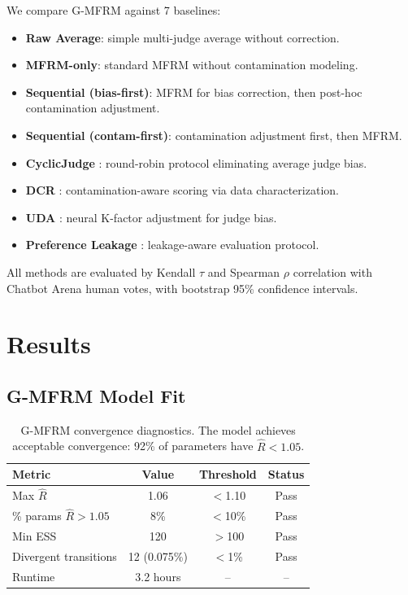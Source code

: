 \documentclass[11pt]{article}
\begin{document}
We compare G-MFRM against 7 baselines:
\begin{itemize}
\item \textbf{Raw Average}: simple multi-judge average without correction.
\item \textbf{MFRM-only}: standard MFRM without contamination modeling.
\item \textbf{Sequential (bias-first)}: MFRM for bias correction, then post-hoc contamination adjustment.
\item \textbf{Sequential (contam-first)}: contamination adjustment first, then MFRM.
\item \textbf{CyclicJudge} \citep{cyclicjudge2025}: round-robin protocol eliminating average judge bias.
\item \textbf{DCR} \citep{dcr2025}: contamination-aware scoring via data characterization.
\item \textbf{UDA} \citep{uda2025}: neural K-factor adjustment for judge bias.
\item \textbf{Preference Leakage} \citep{prefleak2025}: leakage-aware evaluation protocol.
\end{itemize}

All methods are evaluated by Kendall $\tau$ and Spearman $\rho$ correlation with Chatbot Arena human votes, with bootstrap 95\% confidence intervals.

\section{Results}

\subsection{G-MFRM Model Fit}
\label{sec:fit}

\begin{table}[t]
\centering
\caption{G-MFRM convergence diagnostics. The model achieves acceptable convergence: 92\% of parameters have $\hat{R} < 1.05$.}
\label{tab:convergence}
\begin{tabular}{lccc}
\toprule
Metric & Value & Threshold & Status \\
\midrule
Max $\hat{R}$ & 1.06 & $<$1.10 & Pass \\
\% params $\hat{R} > 1.05$ & 8\% & $<$10\% & Pass \\
Min ESS & 120 & $>$100 & Pass \\
Divergent transitions & 12 (0.075\%) & $<$1\% & Pass \\
Runtime & 3.2 hours & -- & -- \\
\bottomrule
\end{tabular}
\end{table}
\end{document}
